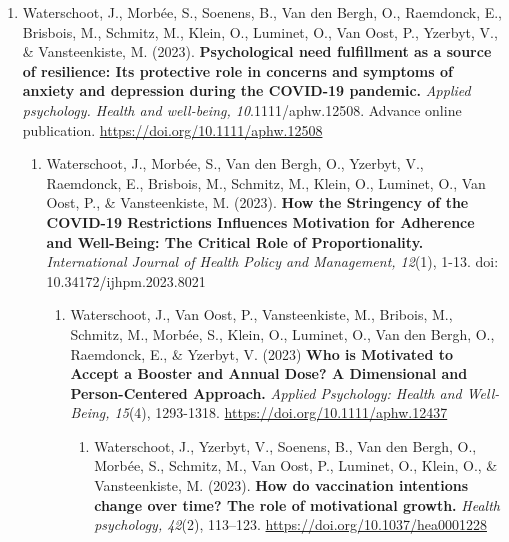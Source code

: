 \documentclass[
  twocolumn]{article}
\providecommand{\tightlist}{%
  \setlength{\itemsep}{0pt}\setlength{\parskip}{0pt}}
\begin{document}
\begin{enumerate}
\def\labelenumi{\arabic{enumi}.}
\setcounter{enumi}{31}
\tightlist
\item
  Waterschoot, J., Morbée, S., Soenens, B., Van den Bergh, O.,
  Raemdonck, E., Brisbois, M., Schmitz, M., Klein, O., Luminet, O., Van
  Oost, P., Yzerbyt, V., \& Vansteenkiste, M. (2023).
  \textbf{Psychological need fulfillment as a source of resilience: Its
  protective role in concerns and symptoms of anxiety and depression
  during the COVID-19 pandemic.} \emph{Applied psychology. Health and
  well-being, 10}.1111/aphw.12508. Advance online publication.
  \url{https://doi.org/10.1111/aphw.12508}

  \begin{enumerate}
  \def\labelenumii{\arabic{enumii}.}
  \setcounter{enumii}{30}
  \tightlist
  \item
    Waterschoot, J., Morbée, S., Van den Bergh, O., Yzerbyt, V.,
    Raemdonck, E., Brisbois, M., Schmitz, M., Klein, O., Luminet, O.,
    Van Oost, P., \& Vansteenkiste, M. (2023). \textbf{How the
    Stringency of the COVID-19 Restrictions Influences Motivation for
    Adherence and Well-Being: The Critical Role of Proportionality.}
    \emph{International Journal of Health Policy and Management, 12}(1),
    1-13. doi: 10.34172/ijhpm.2023.8021

    \begin{enumerate}
    \def\labelenumiii{\arabic{enumiii}.}
    \setcounter{enumiii}{29}
    \tightlist
    \item
      Waterschoot, J., Van Oost, P., Vansteenkiste, M., Bribois, M.,
      Schmitz, M., Morbée, S., Klein, O., Luminet, O., Van den Bergh,
      O., Raemdonck, E., \& Yzerbyt, V. (2023) \textbf{Who is Motivated
      to Accept a Booster and Annual Dose? A Dimensional and
      Person-Centered Approach.} \emph{Applied Psychology: Health and
      Well-Being, 15}(4), 1293-1318.
      \url{https://doi.org/10.1111/aphw.12437}

      \begin{enumerate}
      \def\labelenumiv{\arabic{enumiv}.}
      \setcounter{enumiv}{28}
      \tightlist
      \item
        Waterschoot, J., Yzerbyt, V., Soenens, B., Van den Bergh, O.,
        Morbée, S., Schmitz, M., Van Oost, P., Luminet, O., Klein, O.,
        \& Vansteenkiste, M. (2023). \textbf{How do vaccination
        intentions change over time? The role of motivational growth.}
        \emph{Health psychology, 42}(2), 113--123.
        \url{https://doi.org/10.1037/hea0001228}


\end{enumerate}
\end{enumerate}
\end{enumerate}
\end{enumerate}
\end{document}
